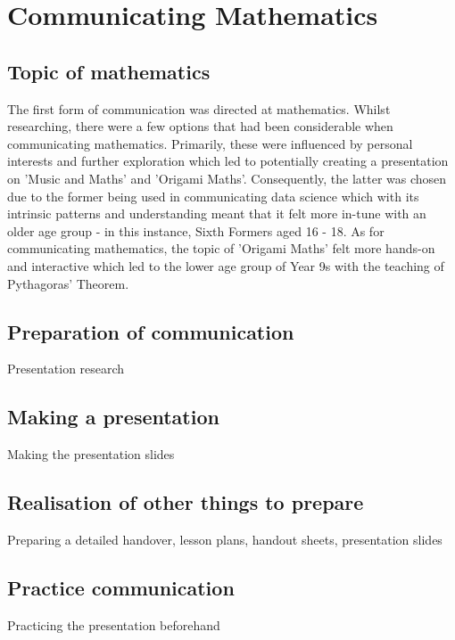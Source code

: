 \documentclass[12pt, a4paper,oneside]{book}
\numberwithin{equation}{section}
\begin{document}
\chapter{Communicating Mathematics}\label{ch:x.x}

\section{Topic of mathematics}\label{sec:x.x}
The first form of communication was directed at mathematics. Whilst researching, there were a few options that had been considerable when communicating mathematics. Primarily, these were influenced by personal interests and further exploration which led to potentially creating a presentation on 'Music and Maths' and 'Origami Maths'. Consequently, the latter was chosen due to the former being used in communicating data science which with its intrinsic patterns and understanding meant that it felt more in-tune with an older age group - in this instance, Sixth Formers aged 16 - 18. As for communicating mathematics, the topic of 'Origami Maths' felt more hands-on and interactive which led to the lower age group of Year 9s with the teaching of Pythagoras' Theorem.

\section{Preparation of communication}\label{sec:x.x}

Presentation research

\section{Making a presentation}\label{sec:x.x}

Making the presentation slides

\section{Realisation of other things to prepare}\label{sec:x.x}

Preparing a detailed handover, lesson plans, handout sheets, presentation slides

\section{Practice communication}\label{sec:x.x}

Practicing the presentation beforehand
\end{document}
